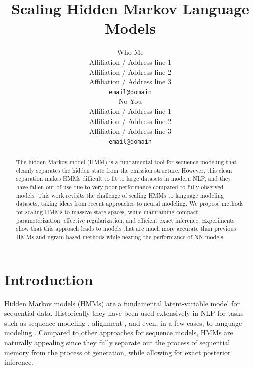 \documentclass[11pt,a4paper]{article}
\title{Scaling Hidden Markov Language Models}
\author{Who Me \\
  Affiliation / Address line 1 \\
  Affiliation / Address line 2 \\
  Affiliation / Address line 3 \\
  \texttt{email@domain} \\\And
  No You \\
  Affiliation / Address line 1 \\
  Affiliation / Address line 2 \\
  Affiliation / Address line 3 \\
  \texttt{email@domain} \\}
\date{}
\begin{document}
\maketitle
\begin{abstract}
The hidden Markov model (HMM) is a fundamental tool for sequence modeling that 
cleanly separates the hidden state from the emission structure.
However, this clean separation makes HMMs difficult to fit to large datasets in modern NLP, 
and they have fallen out of use due to very poor performance 
compared to fully observed models. This work revisits the challenge of 
scaling HMMs to language modeling datasets, taking ideas from recent approaches to neural modeling.
We propose methods for scaling HMMs to massive state spaces, while maintaining compact parameterization, effective regularization, and efficient exact inference. Experiments show that this approach leads to models that are much more accurate than previous HMMs and ngram-based methods while nearing the performance of NN models. 
\end{abstract}

\section{Introduction}


Hidden Markov models (HMMs) are a fundamental latent-variable model for sequential data.
Historically they have been used extensively in NLP for tasks such as
sequence modeling \citep{rabiner1990tut}, alignment \citep{vogel1996hmm},
and even, in a few cases, to language modeling \citep{kuhn1994hmmlm,huang2011thesis}. 
Compared to other approaches for sequence models, HMMs are naturally appealing since they 
fully separate out the process of sequential memory from the process of generation, while allowing for 
exact posterior inference. 


\end{document}
